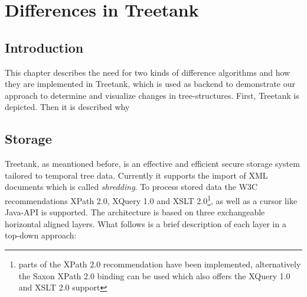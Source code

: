 \section{Differences in Treetank}\label{sec::differences}
\subsection{Introduction}
This chapter describes the need for two kinds of difference algorithms and how they are implemented in Treetank, which is used as backend to demonstrate our approach to determine and visualize changes in tree-structures. First, Treetank is depicted. Then it is described why 

\subsection{Storage}
Treetank, as meantioned before, is an effective and efficient secure storage system tailored to temporal tree data. Currently it supports the import of XML documents which is called \emph{shredding}. To process stored data the W3C recommendations XPath 2.0, XQuery 1.0 and XSLT 2.0\footnote{parts of the XPath 2.0 recommendation have been implemented, alternatively the Saxon XPath 2.0 binding can be used which also offers the XQuery 1.0 and XSLT 2.0 support}, as well as a cursor like Java-API is supported. The architecture is based on three exchangeable horizontal aligned layers. What follows is a brief description of each layer in a top-down approach:

